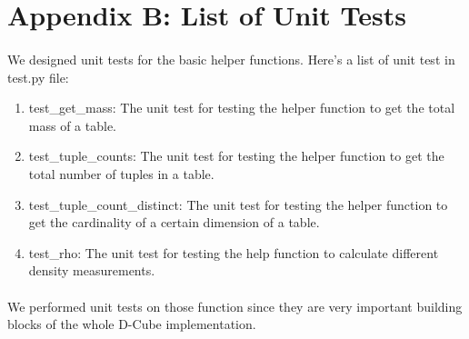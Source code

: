 \section*{Appendix B: List of Unit Tests}
\paragraph{} We designed unit tests for the basic helper functions. Here's a list of unit test in test.py file:
\begin{enumerate}
    \item test\_get\_mass: The unit test for testing the helper function to get the total mass of a table. 
    \item test\_tuple\_counts: The unit test for testing the helper function to get the total number of tuples in a table.
    \item test\_tuple\_count\_distinct: The unit test for testing the helper function to get the cardinality of a certain dimension of a table.
    \item test\_rho: The unit test for testing the help function to calculate different density measurements.
\end{enumerate}
\paragraph{} We performed unit tests on those function since they are very important building blocks of the whole D-Cube implementation.